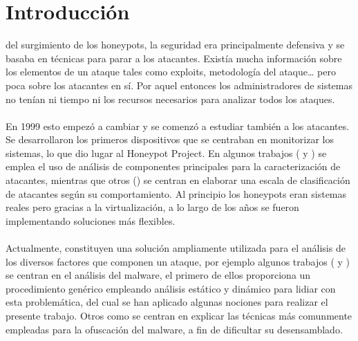 \documentclass[journal]{IEEEtran}
\begin{document}
%
\IEEEpeerreviewmaketitle



\section{Introducción}
 del surgimiento de los honeypots, la seguridad era principalmente defensiva y se basaba en técnicas para parar a los atacantes. Existía mucha información sobre los elementos de un ataque tales como exploits, metodología del ataque… pero poca sobre los atacantes en sí. Por aquel entonces los administradores de sistemas no tenían ni tiempo ni los recursos necesarios para analizar todos los ataques. 
\\\\
En 1999 esto empezó a cambiar y se comenzó a estudiar también a los atacantes. Se desarrollaron los primeros dispositivos que se centraban en monitorizar los sistemas, lo que dio lugar al Honeypot Project. En algunos trabajos  (\cite{caracterizacion_atacantes} y \cite{caracterizacion_atacantes_2}) se emplea el uso de análisis de componentes principales para la caracterización de atacantes, mientras que otros (\cite{escala_atacantes}) se centran en elaborar una escala de clasificación de atacantes según su comportamiento.  Al principio los honeypots eran sistemas reales pero gracias a la virtualización, a lo largo de los años se fueron implementando soluciones más flexibles.
\\\\
Actualmente, constituyen una solución ampliamente utilizada para el análisis de los diversos factores que componen un ataque, por ejemplo algunos trabajos (\cite{practical_malware_analysis} y \cite{compiled_executables}) se centran en el análisis del malware, el primero de ellos proporciona un procedimiento genérico empleando análisis estático y dinámico para lidiar con esta problemática, del cual se han aplicado algunas nociones para realizar el presente trabajo. Otros como \cite{ofuscation} se centran en explicar las técnicas más comunmente empleadas para la ofuscación del malware, a fin de dificultar su desensamblado.
\\\\
\end{document}
